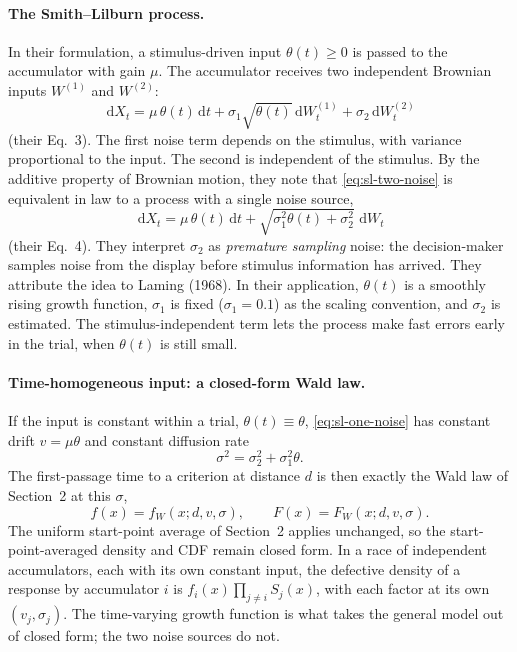 \documentclass[12pt]{article}
\newcommand{\dd}{\,\mathrm{d}}
\begin{document}
\paragraph{The Smith--Lilburn process.}
In their formulation, a stimulus-driven input $\theta(t)\ge0$ is passed to the accumulator with gain $\mu$. The accumulator receives two independent Brownian inputs $W^{(1)}$ and $W^{(2)}$:
\begin{equation}
  \dd X_t=\mu\,\theta(t)\dd t+\sigma_1\sqrt{\theta(t)}\dd W^{(1)}_t
  +\sigma_2\dd W^{(2)}_t
  \label{eq:sl-two-noise}
\end{equation}
(their Eq.~3). The first noise term depends on the stimulus, with variance proportional to the input. The second is independent of the stimulus. By the additive property of Brownian motion, they note that \eqref{eq:sl-two-noise} is equivalent in law to a process with a single noise source,
\begin{equation}
  \dd X_t=\mu\,\theta(t)\dd t+\sqrt{\sigma_1^2\theta(t)+\sigma_2^2}\,\dd W_t
  \label{eq:sl-one-noise}
\end{equation}
(their Eq.~4). They interpret $\sigma_2$ as \emph{premature sampling} noise: the decision-maker samples noise from the display before stimulus information has arrived. They attribute the idea to Laming (1968). In their application, $\theta(t)$ is a smoothly rising growth function, $\sigma_1$ is fixed ($\sigma_1=0.1$) as the scaling convention, and $\sigma_2$ is estimated. The stimulus-independent term lets the process make fast errors early in the trial, when $\theta(t)$ is still small.

\paragraph{Time-homogeneous input: a closed-form Wald law.}
If the input is constant within a trial, $\theta(t)\equiv\theta$,
\eqref{eq:sl-one-noise} has constant drift $v=\mu\theta$ and constant
diffusion rate
\begin{equation}
  \sigma^2=\sigma_2^2+\sigma_1^2\theta .
  \label{eq:sl-constant}
\end{equation}
The first-passage time to a criterion at distance $d$ is then exactly the Wald law of Section~2 at this $\sigma$,
\begin{equation}
  f(x)=f_W(x;d,v,\sigma),\qquad F(x)=F_W(x;d,v,\sigma).
\end{equation}
The uniform start-point average of Section~2 applies unchanged, so the start-point-averaged density and CDF remain closed form. In a race of independent accumulators, each with its own constant input, the defective density of a response by accumulator $i$ is $f_i(x)\prod_{j\ne i}S_j(x)$, with each factor at its own $(v_j,\sigma_j)$. The time-varying growth function is what takes the general model out of closed form; the two noise sources do not.
\end{document}
